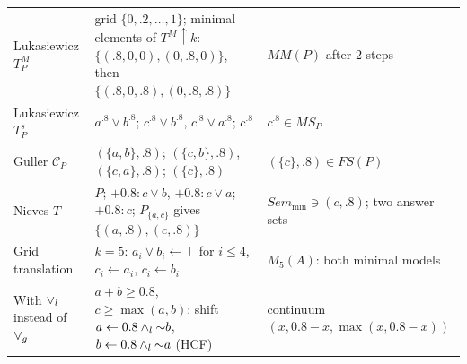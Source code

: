 {\begin{longtable}{@{}p{}p{}p{}@{}}
            Lukasiewicz $T^M_P$ \cite{Lukasiewicz01}                                                                                                                                             & grid $\{0,.2,\dots,1\}$; minimal elements of $T^M\!\uparrow k$: $\{(.8,0,0),(0,.8,0)\}$, then $\{(.8,0,.8),(0,.8,.8)\}$                                       & $\mathit{MM}(P)$ after $2$ steps                                                    \\
            Lukasiewicz $T^s_P$                                                                                                                                                                  & $a^{.8}\lor b^{.8}$; $c^{.8}\lor b^{.8}$, $c^{.8}\lor a^{.8}$; $c^{.8}$                                                                                       & $c^{.8}\in\mathit{MS}_P$                                                            \\
            Guller $\mathcal{C}_P$ \cite{Guller2004procedural}                                                                                                                                   & $(\{a,b\},.8)$; $(\{c,b\},.8)$, $(\{c,a\},.8)$; $(\{c\},.8)$                                                                                                  & $(\{c\},.8)\in\mathit{FS}(P)$                                                       \\
            Nieves $T$ \cite{NievesOC13}                                                                                                                                                         & $P$; $+0.8:c\lor b$, $+0.8:c\lor a$; $+0.8:c$; $P_{\{a,c\}}$ gives $\{(a,.8),(c,.8)\}$                                                                        & $\mathit{Sem}_{\min}\ni(c,.8)$; two answer sets                                     \\
            Grid translation \cite{MushthofaSD14}                                                                                                                                                & $k=5$: $a_i\lor b_i\leftarrow\top$ for $i\leq4$, $c_i\leftarrow a_i$, $c_i\leftarrow b_i$                                                                     & $M_5(A)$: both minimal models                                                       \\
            With $\lor_l$ instead of $\lor_g$                                                                                                                                                & $a+b\geq0.8$, $c\geq\max(a,b)$; shift $a\overset{}{\gets}0.8\land_l\mathord{\sim} b$, $b\overset{}{\gets}0.8\land_l\mathord{\sim} a$ (HCF)                                                & continuum $(x,0.8-x,\max(x,0.8-x))$                                                 \\

\end{longtable}}
